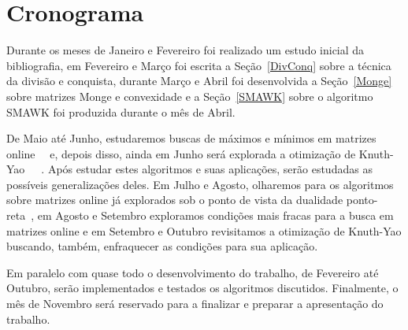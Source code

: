 \section{Cronograma}
Durante os meses de Janeiro e Fevereiro foi realizado um estudo inicial da bibliografia, em Fevereiro e Março foi escrita a Seção~\ref{DivConq} sobre a técnica da divisão e conquista, durante Março e Abril foi desenvolvida a Seção~\ref{Monge} sobre matrizes Monge e convexidade e a Seção~\ref{SMAWK} sobre o algoritmo SMAWK foi produzida durante o mês de Abril.  

De Maio até Junho, estudaremos buscas de máximos e mínimos em matrizes online~\cite{Galil:1992}~\cite{Brucker:1995} e, depois disso, ainda em Junho será explorada a otimização de Knuth-Yao~\cite{Bein:2009}~\cite{Knuth:1971}~\cite{Yao:1980}. Após estudar estes algoritmos e suas aplicações, serão estudadas as possíveis generalizações deles. Em Julho e Agosto, olharemos para os algoritmos sobre matrizes online já explorados sob o ponto de vista da dualidade ponto-reta~\cite{Berg:2000}, em Agosto e Setembro exploramos condições mais fracas para a busca em matrizes online e em Setembro e Outubro revisitamos a otimização de Knuth-Yao buscando, também, enfraquecer as condições para sua aplicação. 

Em paralelo com quase todo o desenvolvimento do trabalho, de Fevereiro até Outubro, serão implementados e testados os algoritmos discutidos. Finalmente, o mês de Novembro será reservado para a finalizar e preparar a apresentação do trabalho.
